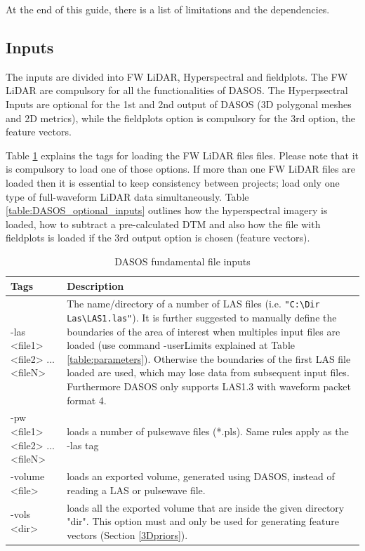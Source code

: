 \documentclass{subfiles}
\begin{document}
		At the end of this guide, there is a list of limitations and the dependencies. 
	
	\subsection{Inputs}\label{inputs}
	\par The inputs are divided into FW LiDAR, Hyperspectral and fieldplots. The FW LiDAR are compulsory for all the functionalities of DASOS. The Hyperpsectral Inputs are optional for the 1st and 2nd output of DASOS (3D polygonal meshes and 2D metrics), while the fieldplots option is compulsory for the 3rd option, the feature vectors. 
	
	\par Table  \ref{table:DASOS_inputs} explains the tags for loading the FW LiDAR files files. Please note that it is compulsory to load one of those options. If more than one FW LiDAR files are loaded then it is essential to keep consistency between projects; load only one type of full-waveform LiDAR data simultaneously. Table \ref{table:DASOS_optional_inputs} outlines how the hyperspectral imagery is loaded, how to subtract a pre-calculated DTM and also how the file with fieldplots is loaded if the 3rd output option is chosen (feature vectors).
	
		
	\begin{table}[!htbp]
	{
		\centering
		\begin{tabular}{|p{3.4cm}|p{10.1cm}|}
			\toprule
			\textbf{Tags}  & \textbf{Description}  \\
			\midrule
			-las <file1> <file2> ... <fileN> & The name/directory of a number of LAS files (i.e. \verb|"C:\Dir Las\LAS1.las"|). It is further suggested to manually define the boundaries of the area of interest when multiples input files are loaded (use command -userLimits explained at Table \ref{table:parameters}). Otherwise the boundaries of the first LAS file loaded are used, which may lose data from subsequent input files. Furthermore DASOS only supports LAS1.3 with waveform packet format 4.    \\
				\cmidrule(r){1-1}\cmidrule(l){2-2}
			-pw <file1> <file2> ... <fileN> &  loads a number of pulsewave files (*.pls). Same rules apply as the -las tag  \\
				\cmidrule(r){1-1}\cmidrule(l){2-2}
			-volume <file> &   loads an exported volume, generated using DASOS, instead of reading a LAS or pulsewave file. \\
				\cmidrule(r){1-1}\cmidrule(l){2-2}
			-vols <dir> &   loads all the exported volume that are inside the given directory "dir". This option must and only be used for generating feature vectors (Section \ref{3Dpriors}). \\
		    \bottomrule
		\end{tabular}
		\caption{DASOS fundamental file inputs}
	   	\label{table:DASOS_inputs}
	}
	\end{table}
	
\end{document}
